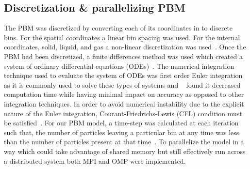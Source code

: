 \documentclass[preprint,11pt,authoryear]{elsarticle}
\begin{document}
\subsection{Discretization \& parallelizing PBM}

The PBM was discretized by converting each of its coordinates in to discrete
bins. For the spatial coordinates a linear bin spacing was used. For the
internal coordinates, solid, liquid, and gas a non-linear discretization was
used~\citep{barrasso2012}. Once the PBM had been discretized, a finite
differences method was used which created a system of ordinary differential
equations (ODEs)~\citep{Barrasso2015cerd}. The numerical integration technique
used to evaluate the system of ODEs was first order Euler integration as it is
commonly used to solve these types of systems and ~\citep{Barrasso2013} 
found it decreased computation time while having minimal impact on 
accuracy as opposed to other integration techniques. In
order to avoid numerical instability due to the explicit nature of the Euler
integration, Courant-Friedrichs-Lewis (CFL) condition must be
satisfied~\citep{courant1967}. For our PBM model, a time-step was calculated at
each iteration such that, the number of particles leaving a particular bin at
any time was less than the number of particles present at that
time~\citep{Ramachandran2010}.
To parallelize the model in a way which
could take advantage of shared memory but still effectively run across a
distributed system both MPI and OMP were implemented. 
\end{document}
